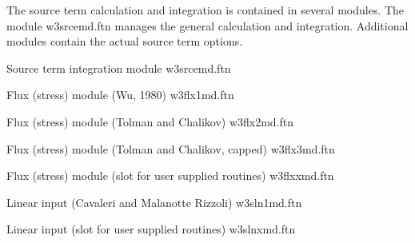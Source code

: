 \vspace{\baselineskip} \noindent
The source term calculation and integration is contained in several
modules. The module {\file w3srcemd.ftn} manages the general calculation and
integration. Additional modules contain the actual source term options.

\vspace{\baselineskip} \noindent
Source term integration module \hfill {\file w3srcemd.ftn}

\begin{flisti}
\end{flisti}

\noindent
Flux (stress) module (Wu, 1980) \hfill {\file w3flx1md.ftn}

\begin{flisti}
\end{flisti}

\noindent
Flux (stress) module (Tolman and Chalikov) \hfill {\file w3flx2md.ftn}

\begin{flisti}
\end{flisti}

\noindent
Flux (stress) module (Tolman and Chalikov, capped) \hfill {\file w3flx3md.ftn}

\begin{flisti}
\end{flisti}

\noindent
Flux (stress) module (slot for user supplied routines) \hfill {\file
w3flxxmd.ftn}

\begin{flisti}
\end{flisti}

\noindent
Linear input (Cavaleri and Malanotte Rizzoli) \hfill {\file w3sln1md.ftn}

\begin{flisti}
\end{flisti}

\pb \noindent
Linear input (slot for user supplied routines) \hfill {\file w3slnxmd.ftn}

\begin{flisti}
\end{flisti}

